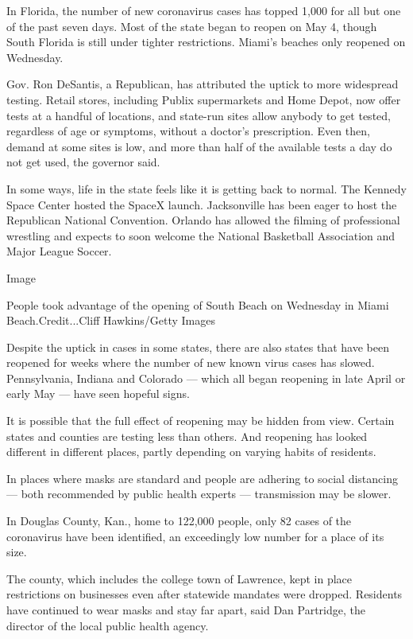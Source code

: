 In Florida, the number of new coronavirus cases has topped 1,000 for all
but one of the past seven days. Most of the state began to reopen on May
4, though South Florida is still under tighter restrictions. Miami's
beaches only reopened on Wednesday.

Gov. Ron DeSantis, a Republican, has attributed the uptick to more
widespread testing. Retail stores, including Publix supermarkets and
Home Depot, now offer tests at a handful of locations, and state-run
sites allow anybody to get tested, regardless of age or symptoms,
without a doctor's prescription. Even then, demand at some sites is low,
and more than half of the available tests a day do not get used, the
governor said.

In some ways, life in the state feels like it is getting back to normal.
The Kennedy Space Center hosted the SpaceX launch. Jacksonville has been
eager to host the Republican National Convention. Orlando has allowed
the filming of professional wrestling and expects to soon welcome the
National Basketball Association and Major League Soccer.

Image

People took advantage of the opening of South Beach on Wednesday in
Miami Beach.Credit...Cliff Hawkins/Getty Images

Despite the uptick in cases in some states, there are also states that
have been reopened for weeks where the number of new known virus cases
has slowed. Pennsylvania, Indiana and Colorado --- which all began
reopening in late April or early May --- have seen hopeful signs.

It is possible that the full effect of reopening may be hidden from
view. Certain states and counties are testing less than others. And
reopening has looked different in different places, partly depending on
varying habits of residents.

In places where masks are standard and people are adhering to social
distancing --- both recommended by public health experts ---
transmission may be slower.

In Douglas County, Kan., home to 122,000 people, only 82 cases of the
coronavirus have been identified, an exceedingly low number for a place
of its size.

The county, which includes the college town of Lawrence, kept in place
restrictions on businesses even after statewide mandates were dropped.
Residents have continued to wear masks and stay far apart, said Dan
Partridge, the director of the local public health agency.

